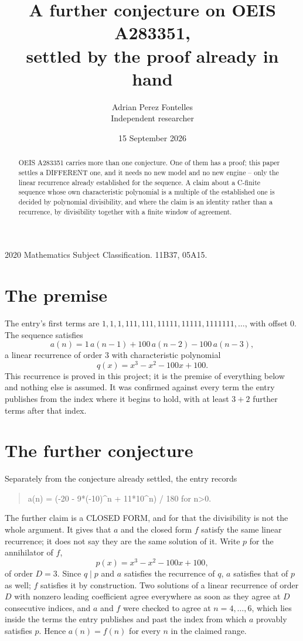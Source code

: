 \documentclass[11pt,a4paper]{article}
\title{A further conjecture on OEIS A283351,\\ \large settled by the proof already in hand}
\author{Adrian Perez Fontelles\\ \small Independent researcher}
\date{15 September 2026}
\theoremstyle{plain}
\theoremstyle{definition}
\begin{document}
\maketitle

\begin{abstract}
OEIS A283351 carries more than one conjecture. One of them has a proof; this paper settles a
DIFFERENT one, and it needs no new model and no new engine -- only the linear recurrence already
established for the sequence. A claim about a C-finite sequence whose own characteristic
polynomial is a multiple of the established one is decided by polynomial divisibility, and where
the claim is an identity rather than a recurrence, by divisibility together with a finite window
of agreement.
\end{abstract}

\noindent\small 2020 Mathematics Subject Classification. 11B37, 05A15.\normalsize

\section{The premise}

The entry's first terms are $1, 1, 1, 111, 111, 11111, 11111, 1111111,\dots$, with offset $0$. The sequence satisfies
\[
  a(n)=1\,a(n-1) + 100\,a(n-2) - 100\,a(n-3) ,
\]
a linear recurrence of order $3$ with characteristic polynomial
\[
  q(x)=x^{3} - x^{2} - 100 x + 100 .
\]
This recurrence is proved in this project; it is the premise of everything below and nothing else is assumed.
It was confirmed against every term the entry publishes from the index where it begins to hold,
with at least $3+2$ further terms after that index.

\section{The further conjecture}

Separately from the conjecture already settled, the entry records

\begin{quote}\raggedright a(n) = (-20 - 9*(-10)\^{}n + 11*10\^{}n) / 180 for n>0.\end{quote}

The further claim is a CLOSED FORM, and for that the divisibility is not the whole argument. It
gives that $a$ and the closed form $f$ satisfy the same linear recurrence; it does not say they
are the same solution of it. Write $p$ for the annihilator of $f$,
\[
  p(x)=x^{3} - x^{2} - 100 x + 100 ,
\]
of order $D=3$. Since $q\mid p$ and $a$ satisfies the recurrence of $q$, $a$ satisfies that of
$p$ as well; $f$ satisfies it by construction. Two solutions of a linear recurrence of order $D$
with nonzero leading coefficient agree everywhere as soon as they agree at $D$ consecutive
indices, and $a$ and $f$ were checked to agree at $n=4,\dots,6$,
which lies inside the terms the entry publishes and past the index from which $a$ provably
satisfies $p$. Hence $a(n)=f(n)$ for every $n$ in the claimed range.
\end{document}
